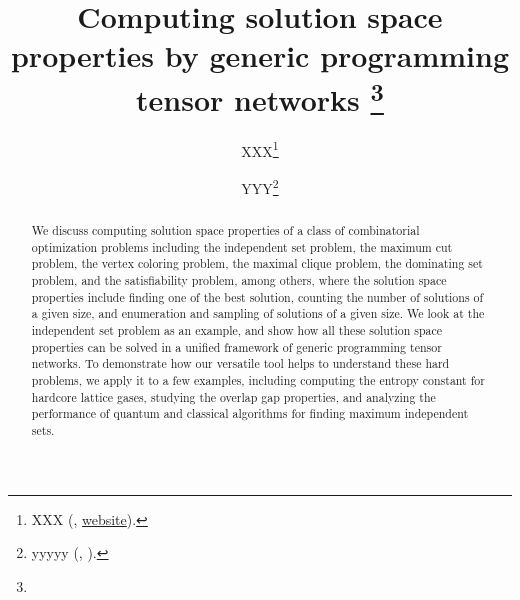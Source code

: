 \documentclass[onefignum, onetabnum]{siamart190516}
\title{Computing solution space properties by generic programming tensor networks
\thanks{\funding{...}}
}
\author{XXX\thanks{XXX 
  (\email{email}, \url{website}).}
\and YYY\thanks{yyyyy 
  (\email{yyyy}, \email{email}).}
}
\newcommand{\<}{\langle}
\renewcommand{\>}{\rangle}
\newcounter{example}
\begin{document}
\maketitle

\begin{abstract}
We discuss computing solution space properties of a class of combinatorial optimization problems including the independent set problem, the maximum cut problem, the vertex coloring problem, the maximal clique problem, the dominating set problem, and the satisfiability problem, among others, where
the solution space properties include finding one of the best solution, counting the number of solutions of a given size, and enumeration and sampling of solutions of a given size.
We look at the independent set problem as an example, and show how all these solution space properties can be solved in a unified framework of generic programming tensor networks.
To demonstrate how our versatile tool helps to understand these hard problems, we apply it to a few examples, including computing the entropy constant for hardcore lattice gases, studying the overlap gap properties, and analyzing the performance of quantum and classical algorithms for finding maximum independent sets.%
\end{abstract}
\end{document}
